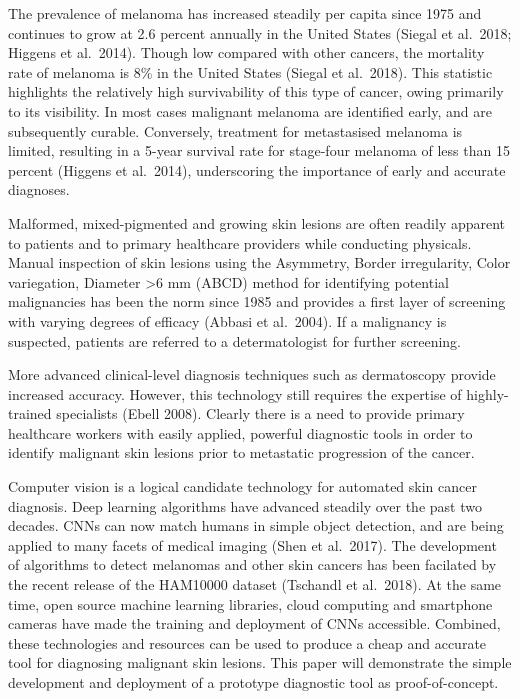 \documentclass[11pt]{article}
\begin{document}
The prevalence of melanoma has increased steadily per capita since 1975
and continues to grow at 2.6 percent annually in the United States
(Siegal et al.~2018; Higgens et al.~2014). Though low compared with
other cancers, the mortality rate of melanoma is 8\% in the United
States (Siegal et al.~2018). This statistic highlights the relatively
high survivability of this type of cancer, owing primarily to its
visibility. In most cases malignant melanoma are identified early, and
are subsequently curable. Conversely, treatment for metastasised
melanoma is limited, resulting in a 5-year survival rate for stage-four
melanoma of less than 15 percent (Higgens et al.~2014), underscoring the
importance of early and accurate diagnoses.

Malformed, mixed-pigmented and growing skin lesions are often readily
apparent to patients and to primary healthcare providers while
conducting physicals. Manual inspection of skin lesions using the
Asymmetry, Border irregularity, Color variegation, Diameter
\textgreater{}6 mm (ABCD) method for identifying potential malignancies
has been the norm since 1985 and provides a first layer of screening
with varying degrees of efficacy (Abbasi et al.~2004). If a malignancy
is suspected, patients are referred to a determatologist for further
screening.

More advanced clinical-level diagnosis techniques such as dermatoscopy
provide increased accuracy. However, this technology still requires the
expertise of highly-trained specialists (Ebell 2008). Clearly there is a
need to provide primary healthcare workers with easily applied, powerful
diagnostic tools in order to identify malignant skin lesions prior to
metastatic progression of the cancer.

Computer vision is a logical candidate technology for automated skin
cancer diagnosis. Deep learning algorithms have advanced steadily over
the past two decades. CNNs can now match humans in simple object
detection, and are being applied to many facets of medical imaging (Shen
et al.~2017). The development of algorithms to detect melanomas and
other skin cancers has been facilated by the recent release of the
HAM10000 dataset (Tschandl et al.~2018). At the same time, open source
machine learning libraries, cloud computing and smartphone cameras have
made the training and deployment of CNNs accessible. Combined, these
technologies and resources can be used to produce a cheap and accurate
tool for diagnosing malignant skin lesions. This paper will demonstrate
the simple development and deployment of a prototype diagnostic tool as
proof-of-concept.
\end{document}

